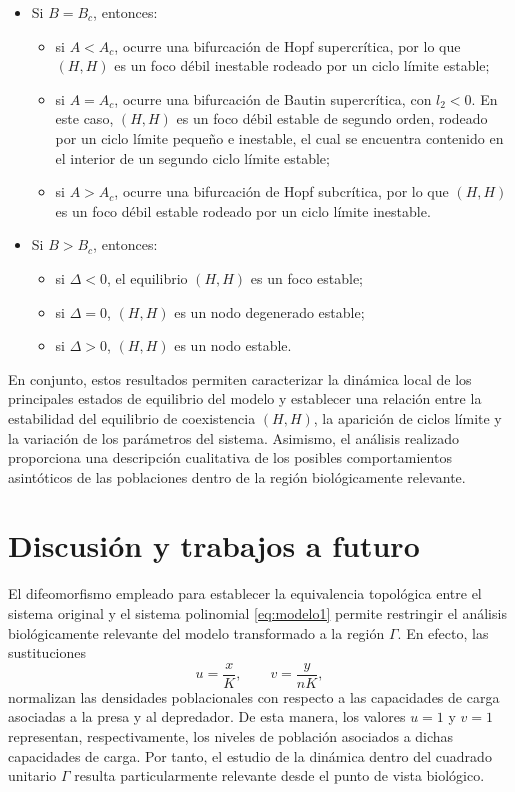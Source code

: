 \begin{enumerate}
\begin{itemize}
		\item Si $B=B_c$, entonces:
		\begin{itemize}
			\item si $A<A_c$, ocurre una bifurcación de Hopf supercrítica, por lo que $(H,H)$ es un foco débil inestable rodeado por un ciclo límite estable;
			
			\item si $A=A_c$, ocurre una bifurcación de Bautin supercrítica, con $l_2<0$. En este caso, $(H,H)$ es un foco débil estable de segundo orden, rodeado por un ciclo límite pequeño e inestable, el cual se encuentra contenido en el interior de un segundo ciclo límite estable;
			
			\item si $A>A_c$, ocurre una bifurcación de Hopf subcrítica, por lo que $(H,H)$ es un foco débil estable rodeado por un ciclo límite inestable.
		\end{itemize}
		
		\item Si $B>B_c$, entonces:
		\begin{itemize}
			\item si $\Delta<0$, el equilibrio $(H,H)$ es un foco estable;
			\item si $\Delta=0$, $(H,H)$ es un nodo degenerado estable;
			\item si $\Delta>0$, $(H,H)$ es un nodo estable.
		\end{itemize}
	\end{itemize}
\end{enumerate}

En conjunto, estos resultados permiten caracterizar la dinámica local de los principales estados de equilibrio del modelo y establecer una relación entre la estabilidad del equilibrio de coexistencia $(H,H)$, la aparición de ciclos límite y la variación de los parámetros del sistema. Asimismo, el análisis realizado proporciona una descripción cualitativa de los posibles comportamientos asintóticos de las poblaciones dentro de la región biológicamente relevante.


\chapter{Discusión y trabajos a futuro}

El difeomorfismo empleado para establecer la equivalencia topológica entre el sistema original y el sistema polinomial \eqref{eq:modelo1} permite restringir el análisis biológicamente relevante del modelo transformado a la región $\Gamma$. En efecto, las sustituciones
\[
u=\dfrac{x}{K},
\qquad
v=\dfrac{y}{nK},
\]
normalizan las densidades poblacionales con respecto a las capacidades de carga asociadas a la presa y al depredador. De esta manera, los valores $u=1$ y $v=1$ representan, respectivamente, los niveles de población asociados a dichas capacidades de carga. Por tanto, el estudio de la dinámica dentro del cuadrado unitario $\Gamma$ resulta particularmente relevante desde el punto de vista biológico.\\

